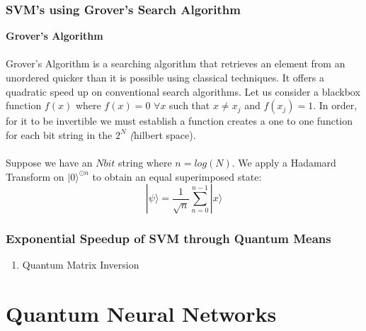 \documentclass[hidelinks,11pt]{article}
\begin{document}
\paragraph{}
\subsubsection{SVM's using Grover's Search Algorithm}
\textbf{Grover's Algorithm}
\paragraph{}
Grover's Algorithm is a searching algorithm that retrieves an element from an unordered quicker than it is possible using classical techniques. It offers a quadratic speed up on conventional search algorithms. Let us consider a blackbox function $f(x)$ where $f(x) = 0$ $\forall x$ such that $x\neq x_j$ and $f(x_j) = 1$. In order, for it to be invertible we must establish a function creates a one to one function for each bit string in the $2^N$ \textit(hilbert space). \paragraph{}
Suppose we have an $N bit$ string where $n = log(N)$. We apply a Hadamard Transform on $|0\rangle^{\odot n}$ to obtain an equal superimposed state: 
$$|\psi\rangle = \frac{1}{\sqrt{n}}\sum_{n=0}^{n-1}|x\rangle$$

\subsubsection{Exponential Speedup of SVM through Quantum Means}

\begin{enumerate}
	\item Quantum Matrix Inversion
\end{enumerate}
\newpage
\section{Quantum Neural Networks}
\newpage
\end{document}
